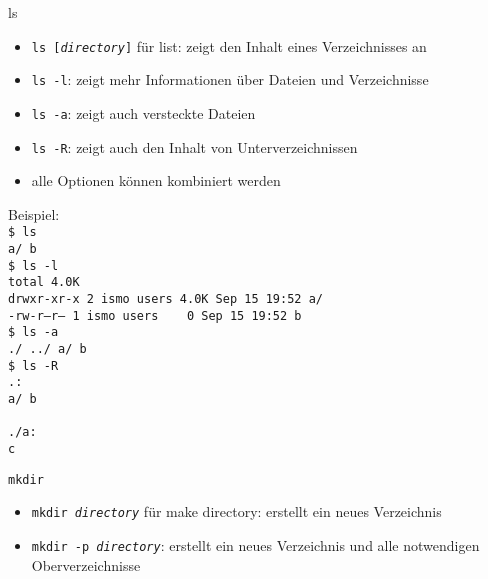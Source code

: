     \begin{frame}{ls}
      \begin{itemize}
        \item \texttt{ls [\textit{directory}]} für list: zeigt den Inhalt eines Verzeichnisses an
        \item \texttt{ls -l}: zeigt mehr Informationen über Dateien und Verzeichnisse
        \item \texttt{ls -a}: zeigt auch versteckte Dateien
        \item \texttt{ls -R}: zeigt auch den Inhalt von Unterverzeichnissen
        \item alle Optionen können kombiniert werden
      \end{itemize}
    \end{frame}

    \begin{frame}
      Beispiel:\\
      \texttt{\$ ls\\
              a/  b\\
              \$ ls -l\\
              total 4.0K\\
              drwxr-xr-x 2 ismo users 4.0K Sep 15 19:52 a/\\
              -rw-r--r-- 1 ismo users \ \ \ 0 Sep 15 19:52 b\\
              \$ ls -a\\
              ./  ../  a/  b\\
              \$ ls -R\\
              .:\\
              a/  b\\
              ~\\
              ./a:\\
              c}
    \end{frame}

    \begin{frame}{\texttt{mkdir}}
      \begin{itemize}
        \item \texttt{mkdir \textit{directory}} für make directory: erstellt ein neues Verzeichnis
        \item \texttt{mkdir -p \textit{directory}}: erstellt ein neues Verzeichnis und alle notwendigen Oberverzeichnisse
      \end{itemize}
    \end{frame}

